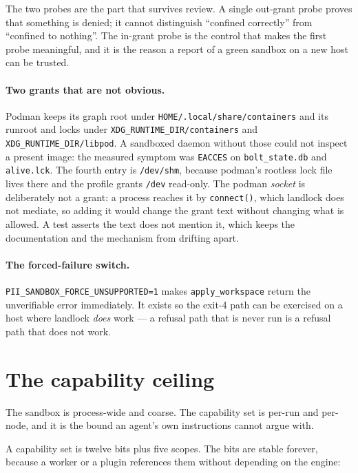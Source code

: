 The two probes are the part that survives review. A single out-grant probe proves that
something is denied; it cannot distinguish ``confined correctly'' from ``confined to
nothing''. The in-grant probe is the control that makes the first probe meaningful, and it is
the reason a report of a green sandbox on a new host can be trusted.

\paragraph{Two grants that are not obvious.} Podman keeps its graph root under
\texttt{HOME/.local/share/containers} and its runroot and locks under
\texttt{XDG\_RUNTIME\_DIR/containers} and \texttt{XDG\_RUNTIME\_DIR/libpod}. A sandboxed
daemon without those could not inspect a present image: the measured symptom was
\texttt{EACCES} on \texttt{bolt\_state.db} and \texttt{alive.lck}. The fourth entry is
\texttt{/dev/shm}, because podman's rootless lock file lives there and the profile grants
\texttt{/dev} read-only. The podman \emph{socket} is deliberately not a grant: a process
reaches it by \texttt{connect()}, which landlock does not mediate, so adding it would change
the grant text without changing what is allowed. A test asserts the text does not mention it,
which keeps the documentation and the mechanism from drifting apart.

\paragraph{The forced-failure switch.} \texttt{PII\_SANDBOX\_FORCE\_UNSUPPORTED=1} makes
\texttt{apply\_workspace} return the unverifiable error immediately. It exists so the exit-4
path can be exercised on a host where landlock \emph{does} work --- a refusal path that is
never run is a refusal path that does not work.

\section{The capability ceiling}

The sandbox is process-wide and coarse. The capability set is per-run and per-node, and it is
the bound an agent's own instructions cannot argue with.

A capability set is twelve bits plus five scopes. The bits are stable forever, because a
worker or a plugin references them without depending on the engine:

